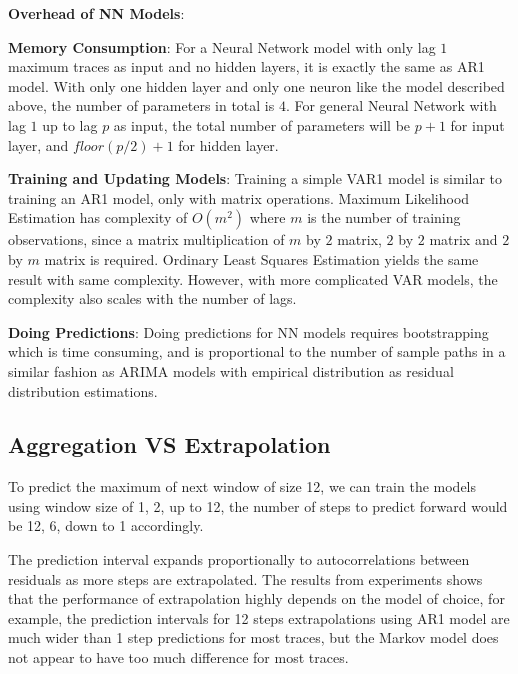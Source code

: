 \documentclass{article}
\begin{document}
\begin{flushleft}
\textbf{Overhead of NN Models}:

\textbf{Memory Consumption}: For a Neural Network model with only lag $1$
maximum traces as input and no hidden layers, it is exactly the same as AR1
model. With only one hidden layer and only one neuron like the model described
above, the number of parameters in total is $4$. For general Neural Network with
lag $1$ up to lag $p$ as input, the total number of parameters will be $p + 1$
for input layer, and $floor(p / 2) + 1$ for hidden layer.

\textbf{Training and Updating Models}: Training a simple VAR1 model is similar
to training an AR1 model, only with matrix operations. Maximum Likelihood
Estimation has complexity of $O(m^2)$ where $m$ is the number of training
observations, since a matrix multiplication of $m$ by $2$ matrix, $2$ by $2$
matrix and $2$ by $m$ matrix is required. Ordinary Least Squares Estimation
yields the same result with same complexity. However, with more complicated VAR
models, the complexity also scales with the number of lags. 

\textbf{Doing Predictions}: Doing predictions for NN models requires
bootstrapping which is time consuming, and is proportional to the number of
sample paths in a similar fashion as ARIMA models with empirical distribution as
residual distribution estimations.  
\end{flushleft}

\subsection{Aggregation VS Extrapolation}

\begin{flushleft}
To predict the maximum of next window of size 12, we can train the models using
window size of 1, 2, up to 12, the number of steps to predict forward would be
12, 6, down to 1 accordingly.
\end{flushleft}

\begin{flushleft}
The prediction interval expands proportionally to autocorrelations between
residuals as more steps are extrapolated. The results from experiments shows
that the performance of extrapolation highly depends on the model of choice, for
example, the prediction intervals for 12 steps extrapolations using AR1 model
are much wider than 1 step predictions for most traces, but the Markov model
does not appear to have too much difference for most traces.
\end{flushleft}
\end{document}
